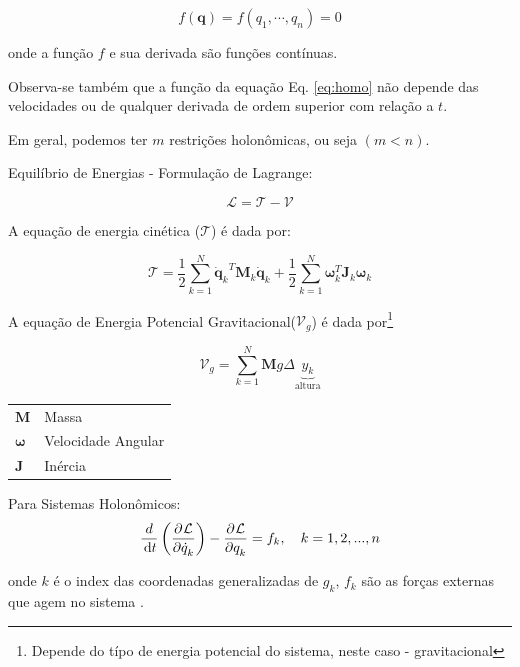  \begin{equation}
     f(\mathbf{q}) = f(q_1, \cdots, q_n) = 0
     \label{eq:homo}
 \end{equation}

 onde a função $f$ e sua derivada são funções contínuas.

 Observa-se também que a função da equação Eq. \ref{eq:homo} não depende das velocidades ou de qualquer derivada de ordem superior com relação a $t$.

 Em geral, podemos ter $m$ restrições holonômicas, ou seja $(m<n)$.




 Equilíbrio de Energias - Formulação de Lagrange:

 \begin{equation}
     \mathcal{L}= \mathcal{T} - \mathcal{V}
 \end{equation}

A equação de energia cinética ($\mathcal{T}$) é dada por:

\begin{equation}
   \mathcal{T} = \frac{1}{2} \sum\limits_{k=1}^{N}{\mathbf{\dot{q}}_k}^T  \mathbf{M}_k {\mathbf{\dot{q}}_k}+ \frac{1}{2} \sum\limits_{k=1}^{N}\mathbf{\omega}_k^T \mathbf{J}_k \mathbf{\omega}_k
\end{equation}

A equação de Energia Potencial Gravitacional($\mathcal{V}_g$) é dada por\footnote{Depende do típo de energia potencial do sistema, neste caso - gravitacional}

\begin{equation}
   \mathcal{V}_g = \sum\limits_{k=1}^{N}\mathbf{M}g\Delta \underbrace{y_k}_{\text{altura}}
\end{equation}  


\begin{tabular}{l|l}
    $\mathbf{M}$               & Massa              \\
    $\mathbf{\omega}$ & Velocidade Angular \\
    $\mathbf{J}$               & Inércia         \\
\end{tabular}


Para Sistemas Holonômicos:
\begin{equation}
    \frac{d}{\,\mathrm{d}t}\left( \dfrac{\partial^{}\mathcal{L}}{\partial \dot{q}_k^{}}\right)
    -\dfrac{\partial^{}\mathcal{L}}{\partial q_k^{}}
    = f_k, \quad k = 1,2,...,n
\end{equation}


onde $k$ é o index das coordenadas generalizadas de $g_k$, $f_k$ são as forças externas que agem no sistema .

